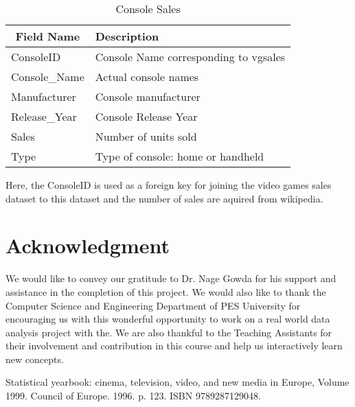 \documentclass[conference]{IEEEtran}
\begin{document}
\begin{table}[htbp]
    \caption{Console Sales}
    \begin{tabular}{ll}
        \hline
        \multicolumn{1}{c}{Field Name} & Description                           \\ \hline
        ConsoleID                      & Console Name corresponding to vgsales \\
        Console\_Name                  & Actual console names                  \\
        Manufacturer                   & Console manufacturer                  \\
        Release\_Year                  & Console Release Year                  \\
        Sales                          & Number of units sold                  \\
        Type                           & Type of console: home or handheld
    \end{tabular}
\end{table}
Here, the ConsoleID is used as a foreign key for joining the video games sales dataset to this dataset and the number of sales are aquired from wikipedia.

\section*{Acknowledgment}
We would like to convey our gratitude to Dr. Nage Gowda for his support and assistance in the completion of this project. We would also like to thank the Computer Science and Engineering Department of PES University for encouraging us with this wonderful opportunity to work on a real world data analysis project with the. We are also thankful to the Teaching Assistants for their involvement and contribution in this course and help us interactively learn new concepts.

\begin{thebibliography}{00}
     Statistical yearbook: cinema, television, video, and new media in Europe, Volume 1999. Council of Europe. 1996. p. 123. ISBN 9789287129048.
\end{thebibliography}
\end{document}
